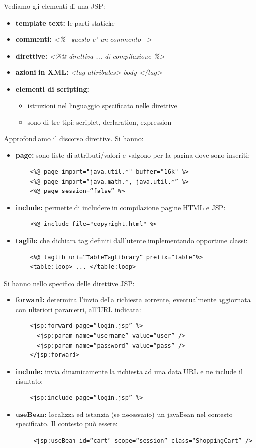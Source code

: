 \message{ !name(sd.tex)}\documentclass[a4paper,12pt, oneside]{book}
\begin{document}
Vediamo gli elementi di una JSP:
\begin{itemize}
	\item \textbf{template text:} le parti statiche
	\item \textbf{commenti:} \textit{<\%-- questo e’ un commento -->}
	\item \textbf{direttive:} \textit{<\%@ direttiva ... di compilazione \%>}
	\item \textbf{azioni in XML:} \textit{<tag attributes> body </tag>}
	\item \textbf{elementi di scripting:}
	\begin{itemize}
		\item istruzioni nel linguaggio specificato nelle direttive
		\item sono di tre tipi: scriplet, declaration, expression
	\end{itemize}
\end{itemize}
Approfondiamo il discorso direttive. Si hanno:
\begin{itemize}
	\item \textbf{page:} sono liste di attributi/valori e valgono per la pagina dove sono inseriti:
	\begin{verbatim}
    <%@ page import="java.util.*" buffer="16k" %>
    <%@ page import=“java.math.*, java.util.*” %>
    <%@ page session=“false” %>
	\end{verbatim}
	\item \textbf{include:} permette di includere in compilazione pagine HTML e JSP:
	\begin{verbatim}
    <%@ include file="copyright.html" %>
	\end{verbatim}
	\item \textbf{taglib:} che dichiara tag definiti dall'utente implementando opportune classi:
	\begin{verbatim}
    <%@ taglib uri=“TableTagLibrary” prefix=“table”%>
    <table:loop> ... </table:loop>
	\end{verbatim} 
\end{itemize}
Si hanno nello specifico delle direttive JSP:
\begin{itemize}
	\item \textbf{forward:} determina l'invio della richiesta corrente, eventualmente aggiornata con ulteriori parametri, all'URL indicata:
	\begin{verbatim}
    <jsp:forward page=“login.jsp” %> 
      <jsp:param name=“username” value=“user” />
      <jsp:param name=“password” value=“pass” />
    </jsp:forward>
	\end{verbatim}
	\item \textbf{include:} invia dinamicamente la richiesta ad una data URL e ne include il risultato:
	\begin{verbatim}
    <jsp:include page=“login.jsp” %>
	\end{verbatim}
	\newpage
	\item \textbf{useBean:} localizza ed istanzia (se necessario) un javaBean nel contesto specificato. Il contesto può essere:
	\begin{verbatim}
     <jsp:useBean id=“cart” scope=“session” class=“ShoppingCart” />
	\end{verbatim}
\end{itemize}
\end{document}
